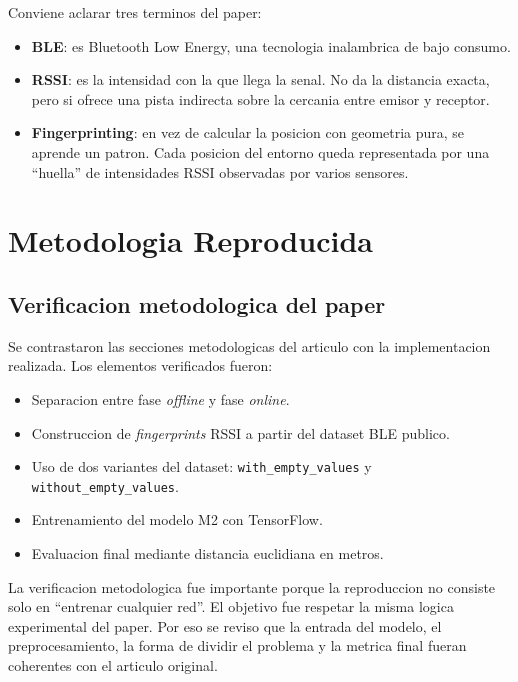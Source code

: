 \documentclass[11pt,a4paper]{article}
\begin{document}
Conviene aclarar tres terminos del paper:
\begin{itemize}
\item \textbf{BLE}: es Bluetooth Low Energy, una tecnologia inalambrica de bajo consumo.
\item \textbf{RSSI}: es la intensidad con la que llega la senal. No da la distancia exacta, pero si ofrece una pista indirecta sobre la cercania entre emisor y receptor.
\item \textbf{Fingerprinting}: en vez de calcular la posicion con geometria pura, se aprende un patron. Cada posicion del entorno queda representada por una ``huella'' de intensidades RSSI observadas por varios sensores.
\end{itemize}

\section{Metodologia Reproducida}
\subsection{Verificacion metodologica del paper}
Se contrastaron las secciones metodologicas del articulo con la implementacion realizada. Los elementos verificados fueron:
\begin{itemize}
\item Separacion entre fase \textit{offline} y fase \textit{online}.
\item Construccion de \textit{fingerprints} RSSI a partir del dataset BLE publico.
\item Uso de dos variantes del dataset: \texttt{with\_empty\_values} y \texttt{without\_empty\_values}.
\item Entrenamiento del modelo M2 con TensorFlow.
\item Evaluacion final mediante distancia euclidiana en metros.
\end{itemize}

La verificacion metodologica fue importante porque la reproduccion no consiste solo en ``entrenar cualquier red''. El objetivo fue respetar la misma logica experimental del paper. Por eso se reviso que la entrada del modelo, el preprocesamiento, la forma de dividir el problema y la metrica final fueran coherentes con el articulo original.
\end{document}
